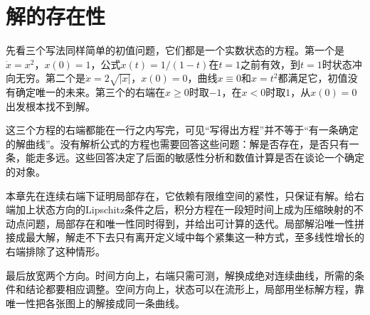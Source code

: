 \chapter{解的存在性}
\label{chap:ode-existence-continuation}

先看三个写法同样简单的初值问题，它们都是一个实数状态的方程。第一个是$\dot x=x^2$，$x(0)=1$，公式$x(t)=1/(1-t)$在$t=1$之前有效，到$t=1$时状态冲向无穷。第二个是$\dot x=2\sqrt{\lvert x\rvert}$，$x(0)=0$，曲线$x\equiv0$和$x=t^2$都满足它，初值没有确定唯一的未来。第三个的右端在$x\geq0$时取$-1$，在$x<0$时取$1$，从$x(0)=0$出发根本找不到解。

这三个方程的右端都能在一行之内写完，可见“写得出方程”并不等于“有一条确定的解曲线”。没有解析公式的方程也需要回答这些问题：解是否存在，是否只有一条，能走多远。这些回答决定了后面的敏感性分析和数值计算是否在谈论一个确定的对象。

本章先在连续右端下证明局部存在，它依赖有限维空间的紧性，只保证有解。给右端加上状态方向的Lipschitz条件之后，积分方程在一段短时间上成为压缩映射的不动点问题，局部存在和唯一性同时得到，并给出可计算的迭代。局部解沿唯一性拼接成最大解，解走不下去只有离开定义域中每个紧集这一种方式，至多线性增长的右端排除了这种情形。

最后放宽两个方向。时间方向上，右端只需可测，解换成绝对连续曲线，所需的条件和结论都要相应调整。空间方向上，状态可以在流形上，局部用坐标解方程，靠唯一性把各张图上的解接成同一条曲线。








